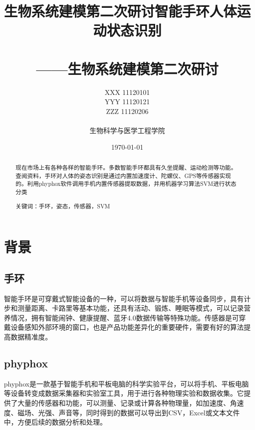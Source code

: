 \documentclass[UTF8]{ctexart}
\title{\Huge 生物系统建模第二次研讨}
\title{\LARGE 智能手环人体运动状态识别\\
        ~\\
       \Large ——生物系统建模第二次研讨}
\author{\Large XXX 11120101 \\
        \Large YYY 11120121 \\
        \Large ZZZ 11120206  \\
        ~\\
        \Large 生物科学与医学工程学院 \\}
\date{\Large \today}
\begin{document}
 \fancyhead[L]{ }
\fancyfoot[C]{\thepage}

\maketitle

\newpage
\begin{abstract}
现在市场上有各种各样的智能手环。多数智能手环都具有久坐提醒、运动检测等功能。查阅资料，手环对人体的姿态识别是通过内置加速度计、陀螺仪、GPS等传感器实现的。利用phyphox软件调用手机内置传感器提取数据，并用机器学习算法SVM进行状态分类

关键词：手环，姿态，传感器，SVM
\end{abstract}
\newpage

\tableofcontents
\newpage

\section{背景}

\subsection{手环}
智能手环是可穿戴式智能设备的一种，可以将数据与智能手机等设备同步，具有计步和测量距离、卡路里等基本功能，还具有活动、锻炼、睡眠等模式，可以记录营养情况，拥有智能闹钟、健康提醒、蓝牙4.0数据传输等特殊功能。传感器是可穿戴设备感知外部环境的窗口，也是产品功能差异化的重要硬件，需要有好的算法提高数据精准度。
\subsection{phyphox}
phyphox是一款基于智能手机和平板电脑的科学实验平台，可以将手机、平板电脑等设备转变成数据采集器和实验室工具，用于进行各种物理实验和数据收集。它提供了大量的传感器和功能，可以测量、记录或计算各种物理量，如加速度、角速度、磁场、光强、声音等，同时得到的数据可以导出到CSV，Excel或文本文件中，方便后续的数据分析和处理。
\cite{Georgopoulos1982}
\end{document}
